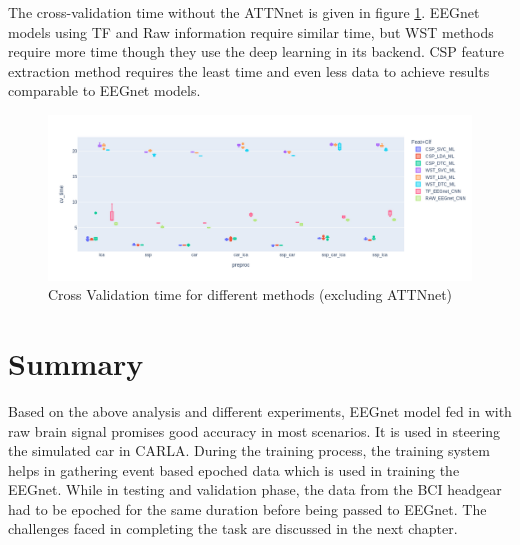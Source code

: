 The cross-validation time without the ATTNnet is given in figure \ref{fig:preproc_cv_time_feat2}.  EEGnet models using TF and Raw information require similar time, but WST methods require more time though they use the deep learning in its backend. CSP feature extraction method requires the least time and even less data to achieve results comparable to EEGnet models. 
     \begin{figure}[H] 
     \begin{center}
        \includegraphics[width=1.0\textwidth]{images/preproc_cv_time_feat2.png}
        \caption{Cross Validation time for different methods (excluding ATTNnet)}
        \label{fig:preproc_cv_time_feat2}
        \end{center}
    \end{figure}
    
\section{Summary}
Based on the above analysis and different experiments, EEGnet model fed in with raw brain signal promises good accuracy in most scenarios. It is used in steering the simulated car in CARLA. During the training process, the training system helps in gathering event based epoched data which is used in training the EEGnet. While in testing and validation phase, the data from the BCI headgear had to be epoched for the same duration before being passed to EEGnet. The challenges faced in completing the task are discussed in the next chapter.